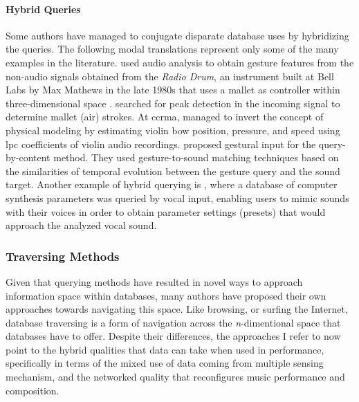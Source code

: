 	\paragraph{Hybrid Queries}
	Some authors have managed to conjugate disparate database uses by hybridizing the queries. The following modal translations represent only some of the many examples in the literature. \textcite{icmc/bbp2372.2001.103} used audio analysis to obtain gesture features from the non-audio signals obtained from the \textit{Radio Drum}, an instrument built at Bell Labs by Max Mathews in the late 1980s that uses a mallet as controller within three-dimensional space \parencite{DBLP:conf/icmc/Boie89}. \textcite{icmc/bbp2372.2001.103} searched for peak detection in the incoming signal to determine mallet (air) strokes. At \gls{ccrma}, \textcite{icmc/bbp2372.2001.071} managed to invert the concept of physical modeling by estimating violin bow position, pressure, and speed using \gls{lpc} coefficients of violin audio recordings. \textcite{Caramiaux2011} proposed gestural input for the query-by-content method. They used gesture-to-sound matching techniques based on the similarities of temporal evolution between the gesture query and the sound target. Another example of hybrid querying is \textcite{mcartwright:2014}, where a database of computer synthesis parameters was queried by vocal input, enabling users to mimic sounds with their voices in order to obtain parameter settings (presets) that would approach the analyzed vocal sound.	

\subsubsection{Traversing Methods}

	Given that querying methods have resulted in novel ways to approach information space within databases, many authors have proposed their own approaches towards navigating this space. Like browsing, or surfing the Internet, database traversing is a form of navigation across the \textit{n}-dimentional space that databases have to offer. Despite their differences, the approaches I refer to now point to the hybrid qualities that data can take when used in performance, specifically in terms of the mixed use of data coming from multiple sensing mechanism, and the networked quality that reconfigures music performance and composition.

